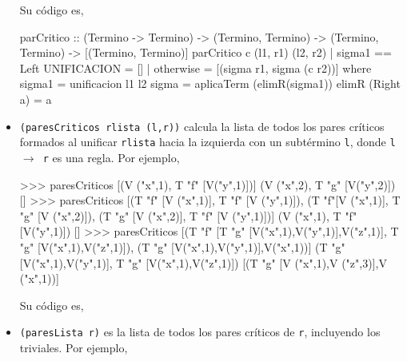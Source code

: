 \begin{itemize}
Su código es,

\begin{codigo}
parCritico :: (Termino -> Termino) -> (Termino, Termino)
           -> (Termino, Termino) -> [(Termino, Termino)]
parCritico c (l1, r1) (l2, r2)
    | sigma1 == Left UNIFICACION = []
    | otherwise = [(sigma r1, sigma (c r2))]
    where sigma1 = unificacion l1 l2
          sigma = aplicaTerm (elimR(sigma1))
          elimR (Right a) = a
\end{codigo}

\item \texttt{(paresCriticos rlista (l,r))} calcula la lista de todos
  los pares críticos formados al unificar \texttt{rlista} hacia la
  izquierda con un subtérmino \texttt{l}, donde \texttt{l
    $\rightarrow$ r} es una regla. Por ejemplo,

\begin{sesion}
>>> paresCriticos [(V ("x",1), T "f" [V("y",1)])]
                  (V ("x",2), T "g" [V("y",2)])
[]
>>> paresCriticos [(T "f" [V ("x",1)], T "f" [V ("y",1)]),
                   (T "f"[V ("x",1)], T "g" [V ("x",2)]), 
                   (T "g" [V ("x",2)],  T "f" [V ("y",1)])] 
                   (V ("x",1), T "f" [V("y",1)])
[]
>>> paresCriticos [(T "f" [T "g" [V("x",1),V("y",1)],V("z",1)],
                    T "g" [V("x",1),V("z",1)]),
                   (T "g" [V("x",1),V("y",1)],V("x",1))]
                   (T "g" [V("x",1),V("y",1)],
                    T "g" [V("x",1),V("z",1)])
[(T "g" [V ("x",1),V ("z",3)],V ("x",1))]
\end{sesion}

Su código es,


\item \texttt{(paresLista r)} es la lista de todos los pares críticos
  de \texttt{r}, incluyendo los triviales. Por ejemplo,


\end{itemize}
